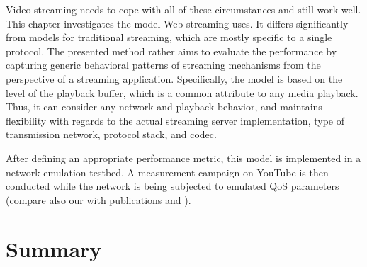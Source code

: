 Video streaming needs to cope with all of these circumstances and still work well. This chapter investigates the model Web streaming uses. It differs significantly from models for traditional streaming, which are mostly specific to a single protocol.
The presented method rather aims to evaluate the performance by capturing generic behavioral patterns of streaming mechanisms from the perspective of a streaming application. Specifically, the model is based on the level of the playback buffer, which is a common attribute to any media playback.
Thus, it can consider any network and playback behavior, and maintains flexibility with regards to the actual streaming server implementation, type of transmission network, protocol stack, and codec.

After defining an appropriate performance metric, this model is implemented in a network emulation testbed. A measurement campaign on YouTube is then conducted while the network is being subjected to emulated \gls{QoS} parameters (compare also our with publications \cite{metzger2011delivery} and \cite{6229739}).















\section{Summary}
\label{c3:conclusion}

